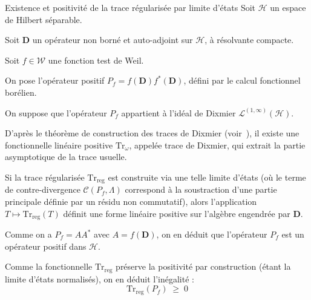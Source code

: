 \documentclass[Riemann_Hypothesis.tex]{subfiles}
\begin{document}
\begin{lemma}[label=lm:PositiviteTraceRegularisee_fr]{Existence et positivité de la trace régularisée par limite d'états}
    Soit $\mathcal{H}$ un espace de Hilbert séparable. \par
    Soit $\mathbf{D}$ un opérateur non borné et auto-adjoint sur $\mathcal{H}$, à résolvante compacte. \par
    Soit $f \in \mathcal{W}$ une fonction test de Weil. \par
    On pose l'opérateur positif $P_f = f(\mathbf{D}) f^*(\mathbf{D})$, défini par le calcul fonctionnel borélien. \par
    On suppose que l'opérateur $P_f$ appartient à l'idéal de Dixmier 
    $\mathcal{L}^{(1, \infty)}(\mathcal{H})$. \par
    D'après le théorème de construction des traces de Dixmier 
    (voir~\cite{connes1994_noncommutative}), 
    il existe une fonctionnelle linéaire positive $\mathrm{Tr}_{\omega}$, appelée trace de Dixmier, qui extrait la partie asymptotique de la trace usuelle. \par
    Si la trace régularisée $\mathrm{Tr}_{\mathrm{reg}}$ est construite via une telle limite d'états (où le terme de contre-divergence $\mathcal{C}(P_f, \Lambda)$ correspond à la soustraction d'une partie principale définie par un résidu non commutatif), alors l'application $T \mapsto \mathrm{Tr}_{\mathrm{reg}}(T)$ définit une forme linéaire positive sur l'algèbre engendrée par $\mathbf{D}$. \par
    Comme on a $P_f = A A^*$ avec $A = f(\mathbf{D})$, on en déduit que l'opérateur $P_f$ est un opérateur positif dans $\mathcal{H}$. \par
    Comme la fonctionnelle $\mathrm{Tr}_{\mathrm{reg}}$ préserve la positivité par construction (étant la limite d'états normalisés), on en déduit l'inégalité :
    \begin{equation*}
        \mathrm{Tr}_{\mathrm{reg}}(P_f) \;\geq\; 0
    \end{equation*}
\end{lemma}
\end{document}
